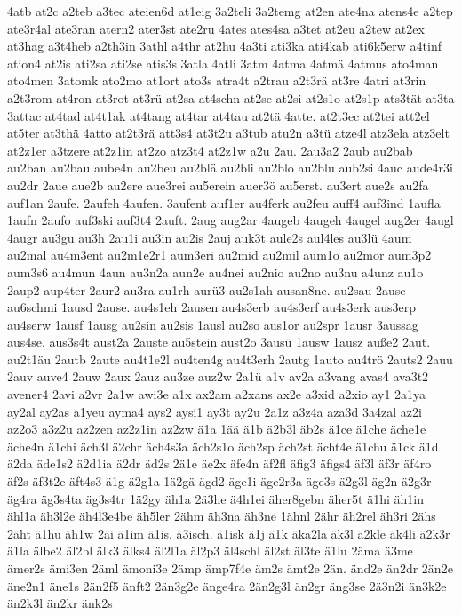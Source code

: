{4atb
at2c
a2teb
a3tec
ateien6d
at1eig
3a2teli
3a2temg
at2en
ate4na
atens4e
a2tep
ate3r4al
ate3ran
atern2
ater3st
ate2ru
4ates
ates4sa
a3tet
at2eu
a2tew
at2ex
at3hag
a3t4heb
a2th3in
3athl
a4thr
at2hu
4a3ti
ati3ka
ati4kab
ati6k5erw
a4tinf
ation4
at2is
ati2sa
ati2se
atis3s
3atla
4atli
3atm
4atma
4atmä
4atmus
ato4man
ato4men
3atomk
ato2mo
at1ort
ato3s
atra4t
a2trau
a2t3rä
at3re
4atri
at3rin
a2t3rom
at4ron
at3rot
at3rü
at2sa
at4schn
at2se
at2si
at2s1o
at2s1p
ats3tät
at3ta
3attac
at4tad
at4t1ak
at4tang
at4tar
at4tau
at2tä
4atte.
at2t3ec
at2tei
att2el
at5ter
at3thä
4atto
at2t3rä
att3s4
at3t2u
a3tub
atu2n
a3tü
atze4l
atz3ela
atz3elt
at2z1er
a3tzere
at2z1in
at2zo
atz3t4
at2z1w
a2u
2au.
2au3a2
2aub
au2bab
au2ban
au2bau
aube4n
au2beu
au2blä
au2bli
au2blo
au2blu
aub2si
4auc
aude4r3i
au2dr
2aue
aue2b
au2ere
aue3rei
au5erein
auer3ö
au5erst.
au3ert
aue2s
au2fa
auf1an
2aufe.
2aufeh
4aufen.
3aufent
auf1er
au4ferk
au2feu
auff4
auf3ind
1aufla
1aufn
2aufo
auf3ski
auf3t4
2auft.
2aug
aug2ar
4augeb
4augeh
4augel
aug2er
4augl
4augr
au3gu
au3h
2au1i
au3in
au2is
2auj
auk3t
aule2s
aul4les
au3lü
4aum
au2mal
au4m3ent
au2m1e2r1
aum3eri
au2mid
au2mil
aum1o
au2mor
aum3p2
aum3s6
au4mun
4aun
au3n2a
aun2e
au4nei
au2nio
au2no
au3nu
a4unz
au1o
2aup2
aup4ter
2aur2
au3ra
au1rh
aurü3
au2s1ah
ausan8ne.
au2sau
2ausc
au6schmi
1ausd
2ause.
au4s1eh
2ausen
au4s3erb
au4s3erf
au4s3erk
aus3erp
au4serw
1ausf
1ausg
au2sin
au2sis
1ausl
au2so
aus1or
au2spr
1ausr
3aussag
aus4se.
aus3s4t
aust2a
2auste
au5stein
aust2o
3ausü
1ausw
1ausz
auße2
2aut.
au2t1äu
2autb
2aute
au4t1e2l
au4ten4g
au4t3erh
2autg
1auto
au4trö
2auts2
2auu
2auv
auve4
2auw
2aux
2auz
au3ze
auz2w
2a1ü
a1v
av2a
a3vang
avas4
ava3t2
avener4
2avi
a2vr
2a1w
awi3e
a1x
ax2am
a2xans
ax2e
a3xid
a2xio
ay1
2a1ya
ay2al
ay2as
a1yeu
ayma4
ays2
aysi1
ay3t
ay2u
2a1z
a3z4a
aza3d
3a4zal
az2i
az2o3
a3z2u
az2zen
az2z1in
az2zw
ä1a
1ää
ä1b
ä2b3l
äb2s
ä1ce
ä1che
äche1e
äche4n
ä1chi
äch3l
ä2chr
äch4s3a
äch2s1o
äch2sp
äch2st
ächt4e
ä1chu
ä1ck
ä1d
ä2da
äde1s2
ä2d1ia
ä2dr
äd2s
2ä1e
äe2x
äfe4n
äf2fl
äfig3
äfigs4
äf3l
äf3r
äf4ro
äf2s
äf3t2e
äft4s3
ä1g
ä2g1a
1ä2gä
ägd2
äge1i
äge2r3a
äge3s
ä2g3l
äg2n
ä2g3r
äg4ra
äg3s4ta
äg3s4tr
1ä2gy
äh1a
2ä3he
ä4h1ei
äher8gebn
äher5t
ä1hi
äh1in
ähl1a
äh3l2e
äh4l3e4be
äh5ler
2ähm
äh3na
äh3ne
1ähnl
2ähr
äh2rel
äh3ri
2ähs
2äht
ä1hu
äh1w
2äi
ä1im
ä1is.
ä3isch.
ä1isk
ä1j
ä1k
äka2la
äk3l
ä2kle
äk4li
ä2k3r
ä1la
älbe2
äl2bl
älk3
älks4
äl2l1a
äl2p3
äl4schl
äl2st
äl3te
ä1lu
2äma
ä3me
ämer2s
ämi3en
2äml
ämoni3e
2ämp
ämp7f4e
äm2s
ämt2e
2än.
änd2e
än2dr
2än2e
äne2n1
äne1s
2än2f5
änft2
2än3g2e
änge4ra
2än2g3l
än2gr
äng3se
2ä3n2i
än3k2e
än2k3l
än2kr
änk2s
}
